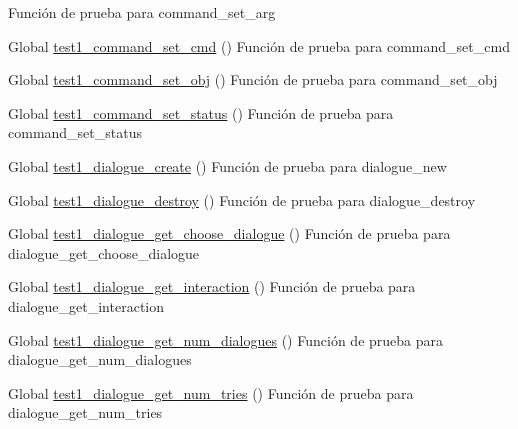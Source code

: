 \begin{DoxyRefList}
%
Función de prueba para command\+\_\+set\+\_\+arg  
\item[Global \mbox{\hyperlink{command__test_8c_ae6bdd5628a9ce9f8dc59f048a63bc34f}{test1\+\_\+command\+\_\+set\+\_\+cmd}} ()]\label{test__test000010}%
%
Función de prueba para command\+\_\+set\+\_\+cmd  
\item[Global \mbox{\hyperlink{command__test_8c_a7e688699618bf5315109bff122df83ff}{test1\+\_\+command\+\_\+set\+\_\+obj}} ()]\label{test__test000021}%
%
Función de prueba para command\+\_\+set\+\_\+obj  
\item[Global \mbox{\hyperlink{command__test_8c_a86c724b0ce8b1a19b138fb1cb5dd84e3}{test1\+\_\+command\+\_\+set\+\_\+status}} ()]\label{test__test000006}%
%
Función de prueba para command\+\_\+set\+\_\+status  
\item[Global \mbox{\hyperlink{dialogue__test_8c_ade1598101fb1b7e43f97c43525fcd7db}{test1\+\_\+dialogue\+\_\+create}} ()]\label{test__test000027}%
%
Función de prueba para dialogue\+\_\+new  
\item[Global \mbox{\hyperlink{dialogue__test_8c_afdb9ffac2d5dd49b0d1af9361fc7a3b1}{test1\+\_\+dialogue\+\_\+destroy}} ()]\label{test__test000029}%
%
Función de prueba para dialogue\+\_\+destroy  
\item[Global \mbox{\hyperlink{dialogue__test_8c_a6dc50305f66769ac2016af059b8326c5}{test1\+\_\+dialogue\+\_\+get\+\_\+choose\+\_\+dialogue}} ()]\label{test__test000044}%
%
Función de prueba para dialogue\+\_\+get\+\_\+choose\+\_\+dialogue  
\item[Global \mbox{\hyperlink{dialogue__test_8c_a301c0f377d2ca75f804230b742e38ebb}{test1\+\_\+dialogue\+\_\+get\+\_\+interaction}} ()]\label{test__test000049}%
%
Función de prueba para dialogue\+\_\+get\+\_\+interaction  
\item[Global \mbox{\hyperlink{dialogue__test_8c_acffd021daed239774cb3a1e83e556824}{test1\+\_\+dialogue\+\_\+get\+\_\+num\+\_\+dialogues}} ()]\label{test__test000039}%
%
Función de prueba para dialogue\+\_\+get\+\_\+num\+\_\+dialogues  
\item[Global \mbox{\hyperlink{dialogue__test_8c_a99fc5930cbe8b1fa8247892b656c9d0d}{test1\+\_\+dialogue\+\_\+get\+\_\+num\+\_\+tries}} ()]\label{test__test000034}%
%
Función de prueba para dialogue\+\_\+get\+\_\+num\+\_\+tries  

\end{DoxyRefList}
